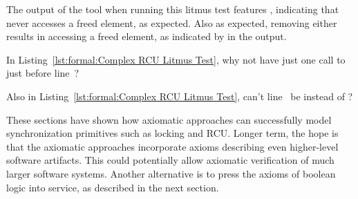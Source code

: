 \begin{lineref}
The output of the  tool when running this litmus test features
, indicating that  never accesses a freed element,
as expected.
Also as expected, removing either  results
in  accessing a freed element, as indicated by 
in the  output.
\end{lineref}

\QuickQuiz{}
	\begin{lineref}
	In Listing~\ref{lst:formal:Complex RCU Litmus Test},
	why not have just one call to 
	just before line~?
	\end{lineref}
 \QuickQuizEnd

\QuickQuiz{}
	\begin{lineref}
	Also in Listing~\ref{lst:formal:Complex RCU Litmus Test},
	can't line~ be  instead
	of ?
	\end{lineref}
 \QuickQuizEnd

These sections have shown how axiomatic approaches can successfully
model synchronization primitives such as locking and RCU.
Longer term, the hope is that the axiomatic approaches incorporate
axioms describing even higher-level software artifacts.
This could potentially allow axiomatic verification of much larger
software systems.
Another alternative is to press the axioms of boolean logic into service,
as described in the next section.
\fi
